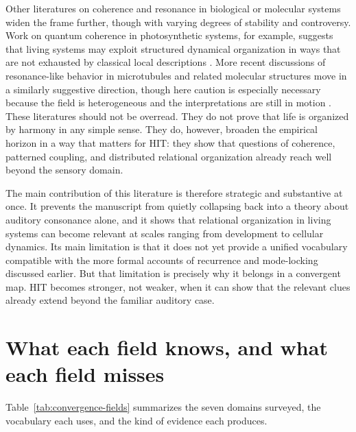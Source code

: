 Other literatures on coherence and resonance in biological or molecular systems widen the frame further, though with varying degrees of stability and controversy. Work on quantum coherence in photosynthetic systems, for example, suggests that living systems may exploit structured dynamical organization in ways that are not exhausted by classical local descriptions \parencite{scholes_2010}. More recent discussions of resonance-like behavior in microtubules and related molecular structures move in a similarly suggestive direction, though here caution is especially necessary because the field is heterogeneous and the interpretations are still in motion \parencite{celardo_2023}. These literatures should not be overread. They do not prove that life is organized by harmony in any simple sense. They do, however, broaden the empirical horizon in a way that matters for HIT: they show that questions of coherence, patterned coupling, and distributed relational organization already reach well beyond the sensory domain.

The main contribution of this literature is therefore strategic and substantive at once. It prevents the manuscript from quietly collapsing back into a theory about auditory consonance alone, and it shows that relational organization in living systems can become relevant at scales ranging from development to cellular dynamics. Its main limitation is that it does not yet provide a unified vocabulary compatible with the more formal accounts of recurrence and mode-locking discussed earlier. But that limitation is precisely why it belongs in a convergent map. HIT becomes stronger, not weaker, when it can show that the relevant clues already extend beyond the familiar auditory case.

\section{What each field knows, and what each field misses}

Table~\ref{tab:convergence-fields} summarizes the seven domains surveyed, the vocabulary each uses, and the kind of evidence each produces.

